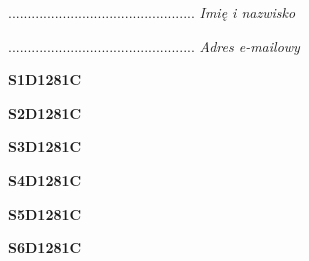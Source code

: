 \begin{turn}{90}\begin{minipage}{\linewidth} \vspace{20mm} ................................................  \textit{Imię i nazwisko}\end{minipage}\end{turn}

\begin{turn}{90}\begin{minipage}{\linewidth} \vspace{20mm} ................................................  \textit{Adres e-mailowy}\end{minipage}\end{turn}

\begin{turn}{90}\huge \begin{minipage}{\linewidth} \vspace{10mm}\textbf{S1D1281C}\end{minipage}\end{turn}

\begin{turn}{90}\huge \begin{minipage}{\linewidth} \vspace{10mm}\textbf{S2D1281C}\end{minipage}\end{turn}

\begin{turn}{90}\huge \begin{minipage}{\linewidth} \vspace{10mm}\textbf{S3D1281C}\end{minipage}\end{turn}

\begin{turn}{90}\huge \begin{minipage}{\linewidth} \vspace{10mm}\textbf{S4D1281C}\end{minipage}\end{turn}

\begin{turn}{90}\huge \begin{minipage}{\linewidth} \vspace{10mm}\textbf{S5D1281C}\end{minipage}\end{turn}

\begin{turn}{90}\huge \begin{minipage}{\linewidth} \vspace{10mm}\textbf{S6D1281C}\end{minipage}\end{turn}


